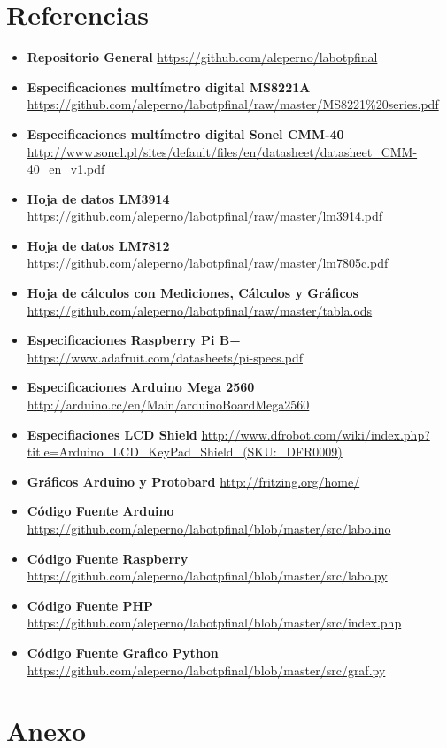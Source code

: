 \documentclass[12pt,a4paper]{article}
\begin{document}
	\section{Referencias}
		\label{sec:referencias}
		\begin{itemize}
		\item \textbf{Repositorio General} \url{https://github.com/aleperno/labotpfinal}
		\item \textbf{Especificaciones multímetro digital MS8221A} \url{https://github.com/aleperno/labotpfinal/raw/master/MS8221%20series.pdf}
		\item \textbf{Especificaciones multímetro digital Sonel CMM-40} \url{http://www.sonel.pl/sites/default/files/en/datasheet/datasheet_CMM-40_en_v1.pdf}
		\item \textbf{Hoja de datos LM3914} \url{https://github.com/aleperno/labotpfinal/raw/master/lm3914.pdf}
		\item \textbf{Hoja de datos LM7812} \url{https://github.com/aleperno/labotpfinal/raw/master/lm7805c.pdf}
		\item \textbf{Hoja de cálculos con Mediciones, Cálculos y Gráficos} \url{https://github.com/aleperno/labotpfinal/raw/master/tabla.ods}
		\item \textbf{Especificaciones Raspberry Pi B+} \url{https://www.adafruit.com/datasheets/pi-specs.pdf}
		\item \textbf{Especificaciones Arduino Mega 2560} \url{http://arduino.cc/en/Main/arduinoBoardMega2560}
		\item \textbf{Especifiaciones LCD Shield} \url{http://www.dfrobot.com/wiki/index.php?title=Arduino_LCD_KeyPad_Shield_(SKU:_DFR0009)}
		\item \textbf{Gráficos Arduino y Protobard} \url{http://fritzing.org/home/}
		\item \textbf{Código Fuente Arduino} \url{https://github.com/aleperno/labotpfinal/blob/master/src/labo.ino}
		\item \textbf{Código Fuente Raspberry} \url{https://github.com/aleperno/labotpfinal/blob/master/src/labo.py}
		\item \textbf{Código Fuente PHP} \url{https://github.com/aleperno/labotpfinal/blob/master/src/index.php}
		\item \textbf{Código Fuente Grafico Python} \url{https://github.com/aleperno/labotpfinal/blob/master/src/graf.py}
		\end{itemize}

	\newpage\null\thispagestyle{empty}\newpage
	\section{Anexo}\label{sec:anexo}
\end{document}
